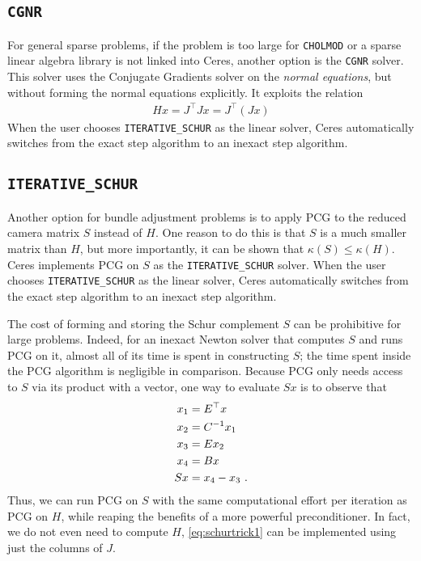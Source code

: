\subsection{\texttt{CGNR}}
For general sparse problems, if the problem is too large for \texttt{CHOLMOD} or a sparse linear algebra library is not linked into Ceres, another option is the \texttt{CGNR} solver. This solver uses the Conjugate Gradients solver on the {\em normal equations}, but without forming the normal equations explicitly. It exploits the relation
\begin{align}
	H x = J^\top J x = J^\top(J x)
\end{align}
When the user chooses \texttt{ITERATIVE\_SCHUR} as the linear solver, Ceres automatically switches from the exact step algorithm to an inexact step algorithm.



\subsection{\texttt{ITERATIVE\_SCHUR}}
Another option for bundle adjustment problems is to apply PCG to the reduced camera matrix $S$ instead of $H$. One reason to do this is that $S$ is a much smaller matrix than $H$, but more importantly, it can be shown that $\kappa(S)\leq \kappa(H)$.  Ceres implements PCG on $S$ as the \texttt{ITERATIVE\_SCHUR} solver. When the user chooses \texttt{ITERATIVE\_SCHUR} as the linear solver, Ceres automatically switches from the exact step algorithm to an inexact step algorithm.

The cost of forming and storing the Schur complement $S$ can be prohibitive for large problems. Indeed, for an inexact Newton solver that computes $S$ and runs PCG on it, almost all of its time is spent in constructing $S$; the time spent inside the PCG algorithm is negligible in comparison. Because  PCG only needs access to $S$ via its product with a vector, one way to evaluate $Sx$ is to observe that
\begin{align}
  x_1 &= E^\top x \notag \\
  x_2 &= C^{-1} x_1 \notag\\
  x_3 &= Ex_2 \notag\\
  x_4 &= Bx \notag\\
  Sx &= x_4 - x_3\ .\label{eq:schurtrick1}
\end{align}
Thus, we can run PCG on $S$ with the same computational effort per iteration as PCG on $H$, while reaping the benefits of a more powerful preconditioner. In fact, we do not even need to compute $H$, \eqref{eq:schurtrick1} can be implemented using just the columns of $J$.

